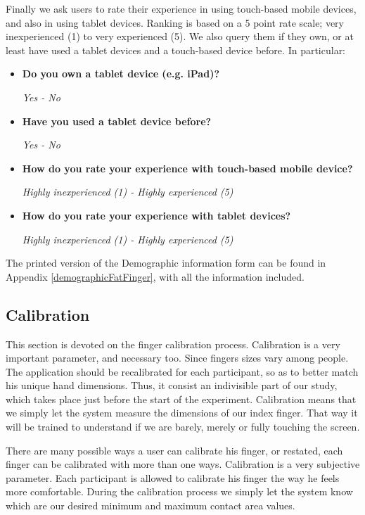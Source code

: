 Finally we ask users to rate their experience in using touch-based mobile devices, and also in using tablet devices. Ranking is based on a 5 point rate scale; very inexperienced (1) to very experienced (5). We also query them if they own, or at least have used a tablet devices and a touch-based device before. In particular:

\begin{itemize}
	\item \textbf{Do you own a tablet device (e.g. iPad)?}

	\emph{Yes - No}
	\item \textbf{Have you used a tablet device before?}
	
	\emph{Yes - No}
	\item \textbf{How do you rate your experience with touch-based mobile device?}

	\emph{Highly inexperienced (1) - Highly experienced (5)}
	\item \textbf{How do you rate your experience with tablet devices?}

	\emph{Highly inexperienced (1) - Highly experienced (5)}
\end{itemize}


The printed version of the Demographic information form can be found in Appendix \ref{demographicFatFinger}, with all the information included. 




\subsection{Calibration}

This section is devoted on the finger calibration process. Calibration is a very important parameter, and necessary too. Since fingers sizes vary among people. The application should be recalibrated for each participant, so as to better match his unique hand dimensions. Thus, it consist an indivisible part of our study, which takes place just before the start of the experiment. Calibration means that we simply let the system measure the dimensions of our index finger. That way it will be trained to understand if we are barely, merely or fully touching the screen.

There are many possible ways a user can calibrate his finger, or restated, each finger can be calibrated with more than one ways. Calibration is a very subjective parameter. Each participant is allowed to calibrate his finger the way he feels more comfortable. During the calibration process we simply let the system know which are our desired minimum and maximum contact area values. 


